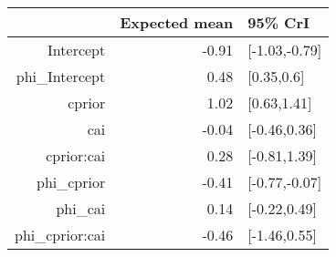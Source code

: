 \begin{tabular}{rrl}
  \hline
 & Expected mean & 95\% CrI \\ 
  \hline
Intercept & -0.91 & [-1.03,-0.79] \\ 
  phi\_Intercept & 0.48 & [0.35,0.6] \\ 
  cprior & 1.02 & [0.63,1.41] \\ 
  cai & -0.04 & [-0.46,0.36] \\ 
  cprior:cai & 0.28 & [-0.81,1.39] \\ 
  phi\_cprior & -0.41 & [-0.77,-0.07] \\ 
  phi\_cai & 0.14 & [-0.22,0.49] \\ 
  phi\_cprior:cai & -0.46 & [-1.46,0.55] \\ 
   \hline
\end{tabular}

